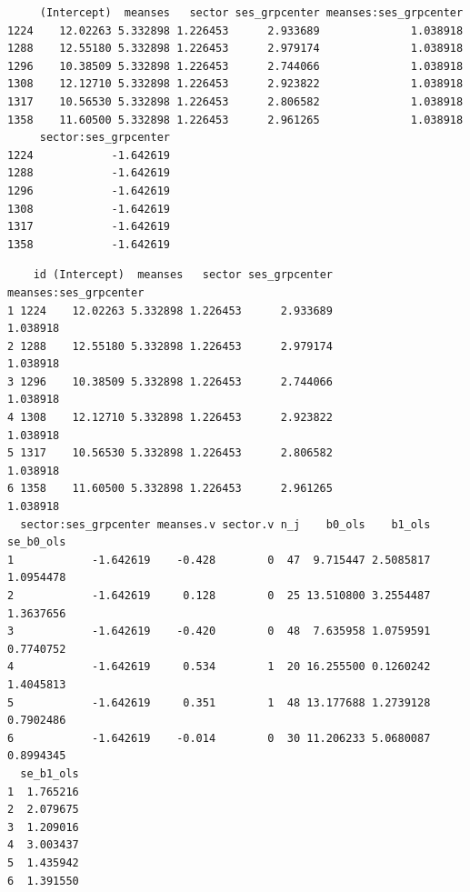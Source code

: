 \documentclass[
  letterpaper,
  DIV=11,
  numbers=noendperiod]{scrreprt}
\newenvironment{Shaded}{\begin{snugshade}}{\end{snugshade}}
\newcommand{\AttributeTok}[1]{\textcolor[rgb]{0.49,0.56,0.16}{#1}}
\newcommand{\CommentTok}[1]{\textcolor[rgb]{0.38,0.63,0.69}{\textit{#1}}}
\newcommand{\FloatTok}[1]{\textcolor[rgb]{0.25,0.63,0.44}{#1}}
\newcommand{\FunctionTok}[1]{\textcolor[rgb]{0.02,0.16,0.49}{#1}}
\newcommand{\NormalTok}[1]{\textcolor[rgb]{0.00,0.44,0.13}{#1}}
\newcommand{\OtherTok}[1]{\textcolor[rgb]{0.00,0.44,0.13}{#1}}
\newcommand{\SpecialCharTok}[1]{\textcolor[rgb]{0.25,0.44,0.63}{#1}}
\newcommand{\StringTok}[1]{\textcolor[rgb]{0.25,0.44,0.63}{#1}}
\begin{document}
\begin{verbatim}
     (Intercept)  meanses   sector ses_grpcenter meanses:ses_grpcenter
1224    12.02263 5.332898 1.226453      2.933689              1.038918
1288    12.55180 5.332898 1.226453      2.979174              1.038918
1296    10.38509 5.332898 1.226453      2.744066              1.038918
1308    12.12710 5.332898 1.226453      2.923822              1.038918
1317    10.56530 5.332898 1.226453      2.806582              1.038918
1358    11.60500 5.332898 1.226453      2.961265              1.038918
     sector:ses_grpcenter
1224            -1.642619
1288            -1.642619
1296            -1.642619
1308            -1.642619
1317            -1.642619
1358            -1.642619
\end{verbatim}

\begin{Shaded}
\end{Shaded}

\begin{verbatim}
    id (Intercept)  meanses   sector ses_grpcenter meanses:ses_grpcenter
1 1224    12.02263 5.332898 1.226453      2.933689              1.038918
2 1288    12.55180 5.332898 1.226453      2.979174              1.038918
3 1296    10.38509 5.332898 1.226453      2.744066              1.038918
4 1308    12.12710 5.332898 1.226453      2.923822              1.038918
5 1317    10.56530 5.332898 1.226453      2.806582              1.038918
6 1358    11.60500 5.332898 1.226453      2.961265              1.038918
  sector:ses_grpcenter meanses.v sector.v n_j    b0_ols    b1_ols se_b0_ols
1            -1.642619    -0.428        0  47  9.715447 2.5085817 1.0954478
2            -1.642619     0.128        0  25 13.510800 3.2554487 1.3637656
3            -1.642619    -0.420        0  48  7.635958 1.0759591 0.7740752
4            -1.642619     0.534        1  20 16.255500 0.1260242 1.4045813
5            -1.642619     0.351        1  48 13.177688 1.2739128 0.7902486
6            -1.642619    -0.014        0  30 11.206233 5.0680087 0.8994345
  se_b1_ols
1  1.765216
2  2.079675
3  1.209016
4  3.003437
5  1.435942
6  1.391550
\end{verbatim}
\end{document}
